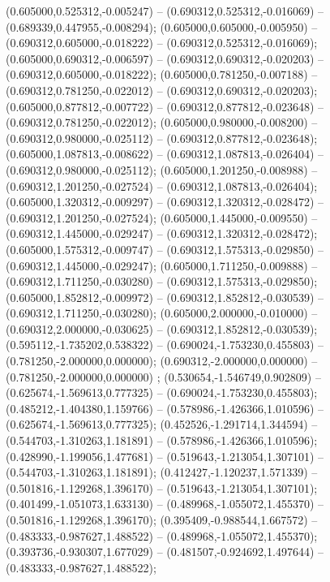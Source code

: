  (0.605000,0.525312,-0.005247) -- (0.690312,0.525312,-0.016069) -- (0.689339,0.447955,-0.008294);
 (0.605000,0.605000,-0.005950) -- (0.690312,0.605000,-0.018222) -- (0.690312,0.525312,-0.016069);
 (0.605000,0.690312,-0.006597) -- (0.690312,0.690312,-0.020203) -- (0.690312,0.605000,-0.018222);
 (0.605000,0.781250,-0.007188) -- (0.690312,0.781250,-0.022012) -- (0.690312,0.690312,-0.020203);
 (0.605000,0.877812,-0.007722) -- (0.690312,0.877812,-0.023648) -- (0.690312,0.781250,-0.022012);
 (0.605000,0.980000,-0.008200) -- (0.690312,0.980000,-0.025112) -- (0.690312,0.877812,-0.023648);
 (0.605000,1.087813,-0.008622) -- (0.690312,1.087813,-0.026404) -- (0.690312,0.980000,-0.025112);
 (0.605000,1.201250,-0.008988) -- (0.690312,1.201250,-0.027524) -- (0.690312,1.087813,-0.026404);
 (0.605000,1.320312,-0.009297) -- (0.690312,1.320312,-0.028472) -- (0.690312,1.201250,-0.027524);
 (0.605000,1.445000,-0.009550) -- (0.690312,1.445000,-0.029247) -- (0.690312,1.320312,-0.028472);
 (0.605000,1.575312,-0.009747) -- (0.690312,1.575313,-0.029850) -- (0.690312,1.445000,-0.029247);
 (0.605000,1.711250,-0.009888) -- (0.690312,1.711250,-0.030280) -- (0.690312,1.575313,-0.029850);
 (0.605000,1.852812,-0.009972) -- (0.690312,1.852812,-0.030539) -- (0.690312,1.711250,-0.030280);
 (0.605000,2.000000,-0.010000) -- (0.690312,2.000000,-0.030625) -- (0.690312,1.852812,-0.030539);
 (0.595112,-1.735202,0.538322) -- (0.690024,-1.753230,0.455803) -- (0.781250,-2.000000,0.000000);
 (0.690312,-2.000000,0.000000) -- (0.781250,-2.000000,0.000000) ;
 (0.530654,-1.546749,0.902809) -- (0.625674,-1.569613,0.777325) -- (0.690024,-1.753230,0.455803);
 (0.485212,-1.404380,1.159766) -- (0.578986,-1.426366,1.010596) -- (0.625674,-1.569613,0.777325);
 (0.452526,-1.291714,1.344594) -- (0.544703,-1.310263,1.181891) -- (0.578986,-1.426366,1.010596);
 (0.428990,-1.199056,1.477681) -- (0.519643,-1.213054,1.307101) -- (0.544703,-1.310263,1.181891);
 (0.412427,-1.120237,1.571339) -- (0.501816,-1.129268,1.396170) -- (0.519643,-1.213054,1.307101);
 (0.401499,-1.051073,1.633130) -- (0.489968,-1.055072,1.455370) -- (0.501816,-1.129268,1.396170);
 (0.395409,-0.988544,1.667572) -- (0.483333,-0.987627,1.488522) -- (0.489968,-1.055072,1.455370);
 (0.393736,-0.930307,1.677029) -- (0.481507,-0.924692,1.497644) -- (0.483333,-0.987627,1.488522);
